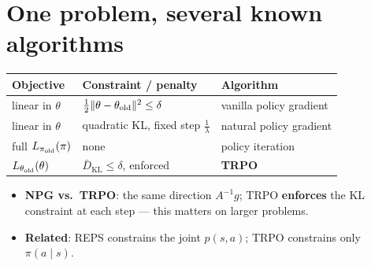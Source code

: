 \section{One problem, several known algorithms}
\label{app:trpo-conn}

\begin{center}
\small
\begin{tabular}{l l l}
\toprule
\textbf{Objective} & \textbf{Constraint / penalty} & \textbf{Algorithm} \\
\midrule
linear in $\theta$ & $\frac12\|\theta-\theta_{\mathrm{old}}\|^2\le\delta$ & vanilla policy gradient \\
linear in $\theta$ & quadratic KL, fixed step $\frac1\lambda$ & natural policy gradient \\
full $L_{\pi_{\mathrm{old}}}(\pi)$ & none & policy iteration \\
$L_{\theta_{\mathrm{old}}}(\theta)$ & $\bar D_{\mathrm{KL}}\le\delta$, enforced & \textbf{TRPO} \\
\bottomrule
\end{tabular}
\end{center}

\begin{itemize}
  \item \textbf{NPG vs.\ TRPO}: the same direction $A^{-1}g$; TRPO \textbf{enforces} the KL constraint at each step --- this matters on larger problems.
  \item \textbf{Related}: REPS constrains the joint $p(s,a)$; TRPO constrains only $\pi(a\mid s)$.
\end{itemize}
